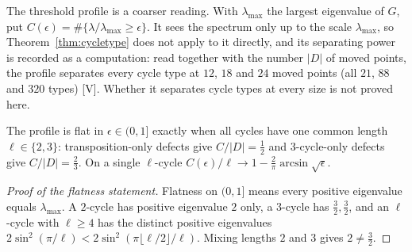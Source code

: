 \documentclass[11pt]{article}
\theoremstyle{remark}\newtheorem{remark}[theorem]{Remark}
\begin{document}
The threshold profile is a coarser reading. With $\lambda_{\max}$ the largest eigenvalue of $G$, put $C(\epsilon)=\#\{\lambda/\lambda_{\max}\ge\epsilon\}$. It sees the spectrum only up to the scale $\lambda_{\max}$, so Theorem~\ref{thm:cycletype} does not apply to it directly, and its separating power is recorded as a computation: read together with the number $|D|$ of moved points, the profile separates every cycle type at $12$, $18$ and $24$ moved points (all $21$, $88$ and $320$ types) [V]. Whether it separates cycle types at every size is not proved here.
\begin{corollary}[T]\label{cor:profile}
The profile is flat in $\epsilon\in(0,1]$ exactly when all cycles have one common length $\ell\in\{2,3\}$: transposition-only defects give $C/|D|=\tfrac12$ and 3-cycle-only defects give $C/|D|=\tfrac23$. On a single $\ell$-cycle $C(\epsilon)/\ell\to1-\tfrac2\pi\arcsin\sqrt\epsilon$.
\end{corollary}
\begin{proof}[Proof of the flatness statement]
Flatness on $(0,1]$ means every positive eigenvalue equals $\lambda_{\max}$. A $2$-cycle has positive eigenvalue $2$ only, a $3$-cycle has $\tfrac32,\tfrac32$, and an $\ell$-cycle with $\ell\ge4$ has the distinct positive eigenvalues $2\sin^2(\pi/\ell)<2\sin^2(\pi\lfloor\ell/2\rfloor/\ell)$. Mixing lengths $2$ and $3$ gives $2\ne\tfrac32$.
\end{proof}
\end{document}

